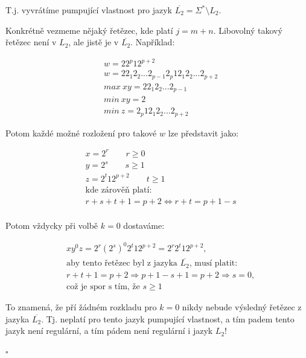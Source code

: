 \documentclass[10pt]{article}
\begin{document}
T.j. vyvrátíme pumpující vlastnost pro jazyk $\overline{L_2} = \Sigma^{*} \setminus L_2$.

Konkrétně vezmeme nějaký řetězec, kde platí $j = m + n$. Libovolný takový řetězec není v $L_2$, ale jistě je v $\overline{L_2}$. Například:

\begin{align*}
& w = 22^{p}12^{p+2} \\
& w = 22_{1}2_{2}...2_{p-1}2_{p}12_{1}2_{2}...2_{p+2} \\
& max~xy = 22_{1}2_{2}...2_{p-1} \\
& min~xy = 2 \\
& min~z = 2_{p}12_{1}2_{2}...2_{p+2}
\end{align*}

Potom každé možné rozložení pro takové $w$ lze představit jako:

\begin{align*}
& x = 2^r \qquad r \geq 0 \\
& y = 2^s \qquad s \geq 1 \\
& z = 2^{t}12^{p+2} \qquad t \geq 1 \\
& \text{kde zárověň platí:} \\
& r + s + t + 1 = p + 2 \Leftrightarrow r + t = p + 1 - s \\
\end{align*}


Potom vždycky při volbě $k=0$ dostaváme:

\begin{align*}
& xy^{0}z = 2^{r}(2^{s})^{0}2^{t}12^{p+2} = 2^{r}2^{t}12^{p+2}, \\
& \text{aby tento řetězec byl z jazyka $\overline{L_2}$, musí platit:} \\
& r + t + 1 = p + 2 \Rightarrow p + 1 - s + 1 = p + 2 \Rightarrow s = 0, \\
& \text{což je spor s tím, že $s \geq 1$}
\end{align*}

To znamená, že pří žádném rozkladu pro $k = 0$ nikdy nebude výsledný řetězec z jazyka $\overline{L_2}$. Tj. neplatí pro tento jazyk pumpující vlastnost, a tím padem tento jazyk není regulární, a tím pádem není regulární i jazyk $L_2$!

\hfill $\square$
\end{document}
